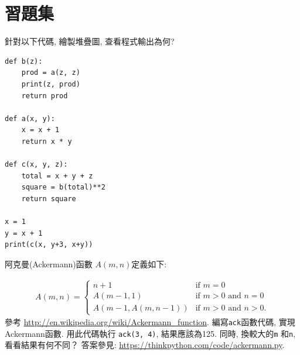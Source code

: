 \documentclass[10pt]{book}
\begin{document}
\section{習題集}

\begin{exercise}
針對以下代碼, 繪製堆疊圖, 查看程式輸出為何?

\begin{verbatim}
def b(z):
    prod = a(z, z)
    print(z, prod)
    return prod

def a(x, y):
    x = x + 1
    return x * y

def c(x, y, z):
    total = x + y + z
    square = b(total)**2
    return square

x = 1
y = x + 1
print(c(x, y+3, x+y))
\end{verbatim}

\end{exercise}


\begin{exercise}
\label{ackermann}

阿克曼(Ackermann)函數 $A(m, n)$定義如下:

\begin{eqnarray*}
A(m, n) = \begin{cases} 
              n+1 & \mbox{if } m = 0 \\ 
        A(m-1, 1) & \mbox{if } m > 0 \mbox{ and } n = 0 \\ 
A(m-1, A(m, n-1)) & \mbox{if } m > 0 \mbox{ and } n > 0.
\end{cases} 
\end{eqnarray*}
%
參考 \url{http://en.wikipedia.org/wiki/Ackermann_function}.
編寫{\tt ack}函數代碼, 實現Ackermann函數. 
用此代碼執行 {\tt ack(3, 4)}, 結果應該為125. 
同時, 換較大的{\tt m} 和{\tt n}, 看看結果有何不同？
答案參見: \url{https://thinkpython.com/code/ackermann.py}.

\end{exercise}
\end{document}

